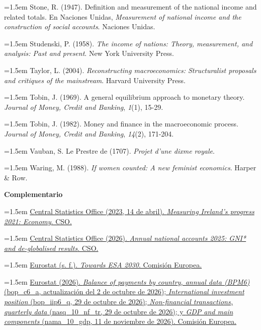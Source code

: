 \documentclass[10pt,a4paper]{article}
\begin{document}
\noindent\hangindent=1.5em Stone, R. (1947). Definition and measurement of the national income and related totals. En Naciones Unidas, \textit{Measurement of national income and the construction of social accounts}. Naciones Unidas.

\noindent\hangindent=1.5em Studenski, P. (1958). \textit{The income of nations: Theory, measurement, and analysis: Past and present}. New York University Press.

\noindent\hangindent=1.5em Taylor, L. (2004). \textit{Reconstructing macroeconomics: Structuralist proposals and critiques of the mainstream}. Harvard University Press.

\noindent\hangindent=1.5em Tobin, J. (1969). A general equilibrium approach to monetary theory. \textit{Journal of Money, Credit and Banking}, \textit{1}(1), 15-29.

\noindent\hangindent=1.5em Tobin, J. (1982). Money and finance in the macroeconomic process. \textit{Journal of Money, Credit and Banking}, \textit{14}(2), 171-204.

\noindent\hangindent=1.5em Vauban, S. Le Prestre de (1707). \textit{Projet d'une dixme royale}.

\noindent\hangindent=1.5em Waring, M. (1988). \textit{If women counted: A new feminist economics}. Harper \& Row.

\textbf{Complementario}

\noindent\hangindent=1.5em \href{https://www.cso.ie/en/releasesandpublications/ep/p-mip/measuringirelandsprogress2021/economy}{Central Statistics Office (2023, 14 de abril). \textit{Measuring Ireland's progress 2021: Economy}. CSO.}

\noindent\hangindent=1.5em \href{https://www.cso.ie/en/releasesandpublications/ep/p-ana/annualnationalaccounts2025/gniandde-globalisedresults/}{Central Statistics Office (2026). \textit{Annual national accounts 2025: GNI* and de-globalised results}. CSO.}

\noindent\hangindent=1.5em \href{https://ec.europa.eu/eurostat/web/esa-2010/towards-esa-2030}{Eurostat (s. f.). \textit{Towards ESA 2030}. Comisión Europea.}

\noindent\hangindent=1.5em \href{https://ec.europa.eu/eurostat/data/database}{Eurostat (2026). \textit{Balance of payments by country, annual data (BPM6)} (bop\_c6\_a, actualización del 2 de octubre de 2026); \textit{International investment position} (bop\_iip6\_q, 29 de octubre de 2026); \textit{Non-financial transactions, quarterly data} (nasq\_10\_nf\_tr, 29 de octubre de 2026); y \textit{GDP and main components} (nama\_10\_gdp, 11 de noviembre de 2026). Comisión Europea.}
\end{document}
